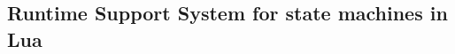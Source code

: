 \begin{appendices}

\chapter{Runtime Support System for state machines in Lua}
\label{app:rts_code}

\end{appendices}
